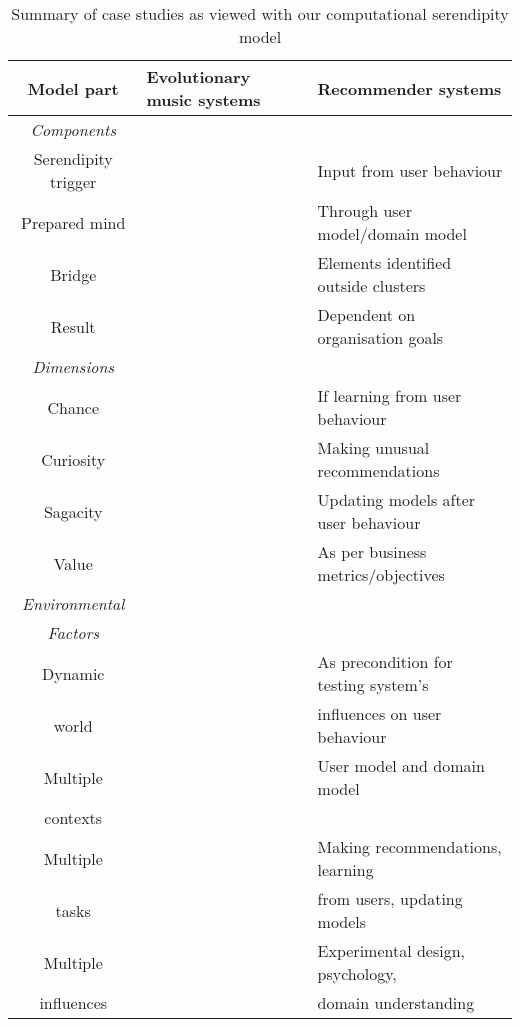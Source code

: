 \small
\begin{table}[ht]%
\caption{Summary of case studies as viewed with our computational serendipity model}
\begin{center}
\begin{tabular}{|c|l|l|}
\hline
{\textbf Model part}  & Evolutionary music systems & Recommender systems \\
\hline
\hline
{\em Components} && \\
\hline
\hline
Serendipity trigger && Input from user behaviour \\
\hline
Prepared mind  & & Through user model/domain model \\
\hline
Bridge  & & Elements identified outside clusters \\
\hline
Result & & Dependent on organisation goals \\
\hline
\hline
{\em Dimensions} && \\
\hline
\hline
Chance & & If learning from user behaviour \\
\hline
Curiosity & & Making unusual recommendations \\
\hline
Sagacity & & Updating models after user behaviour \\
\hline
Value & & As per business metrics/objectives \\
\hline
\hline
{\em Environmental} && \\
{\em Factors} && \\
\hline
\hline
Dynamic && As precondition for testing system's \\
 world && \hspace{3mm} influences on user behaviour\\
\hline
Multiple && User model and domain model\\
contexts && \\
\hline
Multiple && Making recommendations, learning\\
 tasks && \hspace{3mm}from users, updating models \\
\hline
Multiple && Experimental design, psychology, \\
influences && \hspace{3mm} domain understanding\\
\hline
\end{tabular}
\end{center}
\label{caseStudies}
\end{table}%
\normalsize
